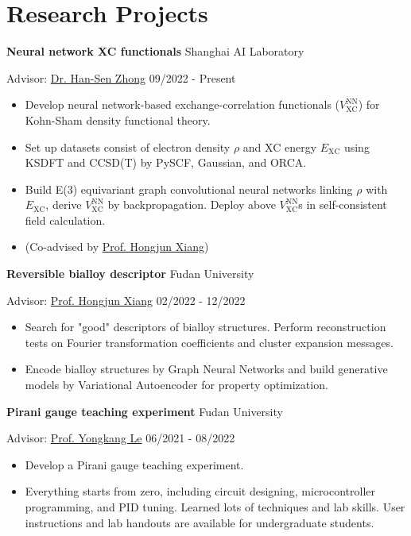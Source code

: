 \documentclass[11pt]{article} %
\begin{document}
\section*{Research Projects}

\textbf{Neural network XC functionals}
\hfill Shanghai AI Laboratory

Advisor: \href{https://scholar.google.com/citations?user=X_ZfX8sAAAAJ}{Dr. Han-Sen Zhong}
\hfill 09/2022 - Present

\begin{itemize}
    \item Develop neural network-based exchange-correlation functionals ($V_{\mathrm{XC}}^{\mathrm{NN}}$) for Kohn-Sham density functional theory.
    \item Set up datasets consist of electron density $\rho$ and XC energy $E_\mathrm{XC}$ using KSDFT and CCSD(T) by PySCF, Gaussian, and ORCA.
    \item Build E(3) equivariant graph convolutional neural networks linking $\rho$ with $E_\mathrm{XC}$, derive $V_{\mathrm{XC}}^{\mathrm{NN}}$ by backpropagation. Deploy above $V_{\mathrm{XC}}^{\mathrm{NN}}$s in self-consistent field calculation.
    \item (Co-advised by \href{https://scholar.google.com/citations?user=5GcATiIAAAAJ}{Prof. Hongjun Xiang})
\end{itemize}



\textbf{Reversible bialloy descriptor}
\hfill Fudan University

Advisor: \href{https://scholar.google.com/citations?user=5GcATiIAAAAJ}{Prof. Hongjun Xiang}
\hfill 02/2022 - 12/2022

\begin{itemize}
    \item Search for "good" descriptors of bialloy structures. Perform reconstruction tests on Fourier transformation coefficients and cluster expansion messages.
    \item Encode bialloy structures by Graph Neural Networks and build generative models by Variational Autoencoder for property optimization.
\end{itemize}



\textbf{Pirani gauge teaching experiment}
\hfill Fudan University

Advisor: \href{http://phylab.fudan.edu.cn/doku.php?id=home:xiaole}{Prof. Yongkang Le}
\hfill 06/2021 - 08/2022

\begin{itemize}
    \item Develop a Pirani gauge teaching experiment.
    \item Everything starts from zero, including circuit designing, microcontroller programming, and PID tuning. Learned lots of techniques and lab skills. User instructions and lab handouts are available for undergraduate students.
\end{itemize}
\end{document}
